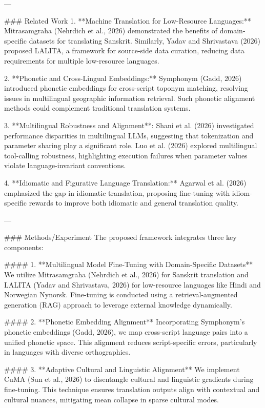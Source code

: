 ---

### Related Work  
1. **Machine Translation for Low-Resource Languages:**  
Mitrasamgraha (Nehrdich et al., 2026) demonstrated the benefits of domain-specific datasets for translating Sanskrit. Similarly, Yadav and Shrivastava (2026) proposed LALITA, a framework for source-side data curation, reducing data requirements for multiple low-resource languages.

2. **Phonetic and Cross-Lingual Embeddings:**  
Symphonym (Gadd, 2026) introduced phonetic embeddings for cross-script toponym matching, resolving issues in multilingual geographic information retrieval. Such phonetic alignment methods could complement traditional translation systems.

3. **Multilingual Robustness and Alignment**:  
Shani et al. (2026) investigated performance disparities in multilingual LLMs, suggesting that tokenization and parameter sharing play a significant role. Luo et al. (2026) explored multilingual tool-calling robustness, highlighting execution failures when parameter values violate language-invariant conventions.

4. **Idiomatic and Figurative Language Translation:**  
Agarwal et al. (2026) emphasized the gap in idiomatic translation, proposing fine-tuning with idiom-specific rewards to improve both idiomatic and general translation quality.

---

### Methods/Experiment  
The proposed framework integrates three key components:  

#### 1. **Multilingual Model Fine-Tuning with Domain-Specific Datasets**  
We utilize Mitrasamgraha (Nehrdich et al., 2026) for Sanskrit translation and LALITA (Yadav and Shrivastava, 2026) for low-resource languages like Hindi and Norwegian Nynorsk. Fine-tuning is conducted using a retrieval-augmented generation (RAG) approach to leverage external knowledge dynamically.

#### 2. **Phonetic Embedding Alignment**  
Incorporating Symphonym's phonetic embeddings (Gadd, 2026), we map cross-script language pairs into a unified phonetic space. This alignment reduces script-specific errors, particularly in languages with diverse orthographies.

#### 3. **Adaptive Cultural and Linguistic Alignment**  
We implement CuMA (Sun et al., 2026) to disentangle cultural and linguistic gradients during fine-tuning. This technique ensures translation outputs align with contextual and cultural nuances, mitigating mean collapse in sparse cultural modes.

